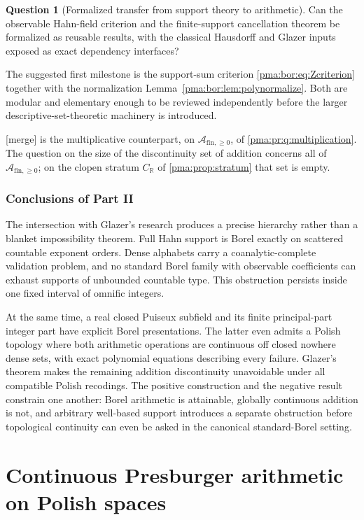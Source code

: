 \documentclass[11pt]{article}
\numberwithin{equation}{section}
\theoremstyle{definition}
\newtheorem{question}[question]{Question}
\theoremstyle{remark}
\newcommand{\R}{\mathbb R}
\newcommand{\PP}{\mathcal A_{\mathrm{fin},\geq 0}}
\newcommand{\mergetag}{\textup{\textsf{\small[merge]}}}
\begin{document}
\begin{question}[Formalized transfer from support theory to arithmetic]
Can the observable Hahn-field criterion and the finite-support cancellation
theorem be formalized as reusable results, with the classical Hausdorff and
Glazer inputs exposed as exact dependency interfaces?
\end{question}
The suggested first milestone is the support-sum criterion
\eqref{pma:bor:eq:Zcriterion} together with the normalization
Lemma~\ref{pma:bor:lem:polynormalize}. Both are modular and elementary enough to be
reviewed independently before the larger descriptive-set-theoretic machinery
is introduced.

\noindent\mergetag{}  is the multiplicative
counterpart, on $\PP$, of \cref{pma:pr:q:multiplication}. The question on the
size of the discontinuity set of addition concerns all of $\PP$; on the clopen
stratum $C_{\R}$ of \cref{pma:prop:stratum} that set is empty.

\section{Conclusions of Part II}\label{pma:bor:sec:conclusion}

The intersection with Glazer's research produces a precise hierarchy rather
than a blanket impossibility theorem. Full Hahn support is Borel exactly on
scattered countable exponent orders. Dense alphabets carry a coanalytic-complete
validation problem, and no standard Borel family with observable coefficients
can exhaust supports of unbounded countable type. This obstruction persists
inside one fixed interval of omnific integers.

At the same time, a real closed Puiseux subfield and its finite principal-part
integer part have explicit Borel presentations. The latter even admits a
Polish topology where both arithmetic operations are continuous off closed
nowhere dense sets, with exact polynomial equations describing every failure.
Glazer's theorem makes the remaining addition discontinuity unavoidable under
all compatible Polish recodings. The positive construction and the negative
result constrain one another: Borel arithmetic is attainable, globally
continuous addition is not, and arbitrary well-based support introduces a
separate obstruction before topological continuity can even be asked in the
canonical standard-Borel setting.

\part{Continuous Presburger arithmetic on Polish spaces}\label{pma:part:cp}
\end{document}
